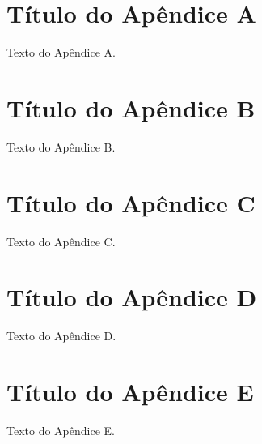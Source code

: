 
\begin{apendicesenv}
	
	\partapendices
	
	\chapter{Título do Apêndice A}
	
	Texto do Apêndice A.
	
	
	
	\chapter{Título do Apêndice B}
	
	Texto do Apêndice B.
	
	
	
	\chapter{Título do Apêndice C}
	
	Texto do Apêndice C.
	
	
	
	\chapter{Título do Apêndice D}
	
	Texto do Apêndice D.
	
	
	
	\chapter{Título do Apêndice E}
	
	Texto do Apêndice E.
	
	
	
\end{apendicesenv}
